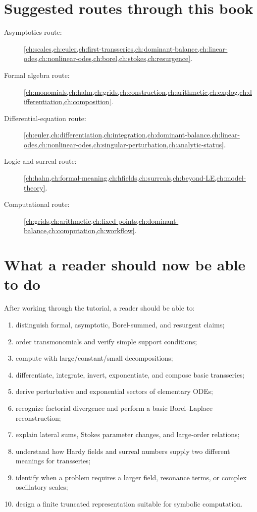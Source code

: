 \documentclass[11pt,openany]{book}
\theoremstyle{definition}
\theoremstyle{plain}
\theoremstyle{remark}
\begin{document}
\section{Suggested routes through this book}

\begin{description}
 \item[Asymptotics route:] \cref{ch:scales,ch:euler,ch:first-transseries,ch:dominant-balance,ch:linear-odes,ch:nonlinear-odes,ch:borel,ch:stokes,ch:resurgence}.
 \item[Formal algebra route:] \cref{ch:monomials,ch:hahn,ch:grids,ch:construction,ch:arithmetic,ch:explog,ch:differentiation,ch:composition}.
 \item[Differential-equation route:] \cref{ch:euler,ch:differentiation,ch:integration,ch:dominant-balance,ch:linear-odes,ch:nonlinear-odes,ch:singular-perturbation,ch:analytic-status}.
 \item[Logic and surreal route:] \cref{ch:hahn,ch:formal-meaning,ch:hfields,ch:surreals,ch:beyond-LE,ch:model-theory}.
 \item[Computational route:] \cref{ch:grids,ch:arithmetic,ch:fixed-points,ch:dominant-balance,ch:computation,ch:workflow}.
\end{description}

\section{What a reader should now be able to do}

After working through the tutorial, a reader should be able to:
\begin{enumerate}
 \item distinguish formal, asymptotic, Borel-summed, and resurgent claims;
 \item order transmonomials and verify simple support conditions;
 \item compute with large/constant/small decompositions;
 \item differentiate, integrate, invert, exponentiate, and compose basic transseries;
 \item derive perturbative and exponential sectors of elementary ODEs;
 \item recognize factorial divergence and perform a basic Borel--Laplace reconstruction;
 \item explain lateral sums, Stokes parameter changes, and large-order relations;
 \item understand how Hardy fields and surreal numbers supply two different meanings for transseries;
 \item identify when a problem requires a larger field, resonance terms, or complex oscillatory scales;
 \item design a finite truncated representation suitable for symbolic computation.
\end{enumerate}
\end{document}
